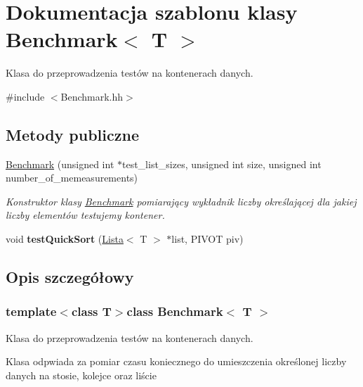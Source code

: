 \hypertarget{class_benchmark}{\section{Dokumentacja szablonu klasy Benchmark$<$ T $>$}
\label{class_benchmark}
}


Klasa do przeprowadzenia testów na kontenerach danych.  




{\ttfamily \#include $<$Benchmark.\-hh$>$}

\subsection*{Metody publiczne}
\begin{DoxyCompactItemize}
\item 
\hyperlink{class_benchmark_a15ccd21b999908da42c58bd5d127c674}{Benchmark} (unsigned int $\ast$test\-\_\-list\-\_\-sizes, unsigned int size, unsigned int number\-\_\-of\-\_\-memeasurements)
\begin{DoxyCompactList}\small\item\em Konstruktor klasy \hyperlink{class_benchmark}{Benchmark} pomiarający wykładnik liczby określającej dla jakiej liczby elementów testujemy kontener. \end{DoxyCompactList}\item 
\hypertarget{class_benchmark_ac6a294f9ac4fbba06f0a608eb241d3b0}{void {\bfseries test\-Quick\-Sort} (\hyperlink{class_lista}{Lista}$<$ T $>$ $\ast$list, P\-I\-V\-O\-T piv)}\label{class_benchmark_ac6a294f9ac4fbba06f0a608eb241d3b0}

\end{DoxyCompactItemize}


\subsection{Opis szczegółowy}
\subsubsection*{template$<$class T$>$class Benchmark$<$ T $>$}

Klasa do przeprowadzenia testów na kontenerach danych. 

Klasa odpwiada za pomiar czasu koniecznego do umieszczenia określonej liczby danych na stosie, kolejce oraz liście 

